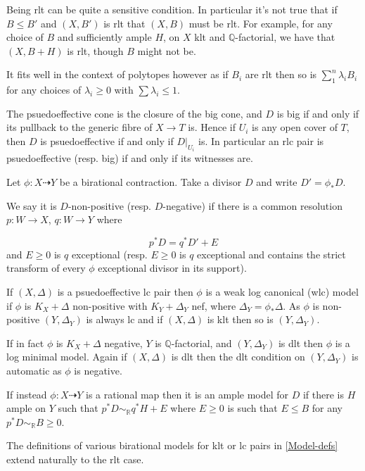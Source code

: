 	Being rlt can be quite a sensitive condition. In particular it's not true that if $B \leq B'$ and $(X,B')$ is rlt that $(X,B)$ must be rlt. For example, for any choice of $B$ and sufficiently ample $H$, on $X$ klt and $\mathbb{Q}$-factorial, we have that $(X,B+H)$ is rlt, though $B$ might not be.
	
	It fits well in the context of polytopes however as if $B_{i}$ are rlt then so is $\sum_{1}^{n} \lambda_{i}B_{i}$ for any choices of $\lambda_{i} \geq 0$ with $\sum \lambda_{i} \leq 1$.
	
	The psuedoeffective cone is the closure of the big cone, and $D$ is big if and only if its pullback to the generic fibre of $X \to T$ is. Hence if $U_{i}$ is any open cover of $T$, then $D$ is psuedoeffective if and only if $D|_{U_{i}}$ is. In particular an rlc pair is psuedoeffective (resp. big) if and only if its witnesses are.
	
	\begin{definition}
		Let $\phi:X \dashrightarrow Y$ be a birational contraction. Take a divisor $D$ and write $D'=\phi_{*}D$. 
		
		We say it is $D$-non-positive (resp. $D$-negative) if there is a common resolution $p:W \to X$, $q:W \to Y$ where 
		
		\[p^{*}D=q^{*}D'+E\]
		and $E \geq 0$ is $q$ exceptional (resp. $E \geq 0$ is $q$ exceptional and contains the strict transform of every $\phi$ exceptional divisor in its support). 
		
		If $(X,\Delta)$ is a psuedoeffective lc pair then $\phi$ is a weak log canonical (wlc) model if $\phi$ is $K_{X}+\Delta$ non-positive with $K_{Y}+\Delta_{Y}$ nef, where $\Delta_{Y}=\phi_{*}\Delta$. As $\phi$ is non-positive $(Y,\Delta_{Y})$ is always lc and if $(X,\Delta)$ is klt then so is $(Y,\Delta_{Y})$. 
		
		If in fact $\phi$ is $K_{X}+\Delta$ negative, $Y$ is $\mathbb{Q}$-factorial, and $(Y,\Delta_{Y})$ is dlt then $\phi$ is a log minimal model. Again if $(X,\Delta)$ is dlt then the dlt condition on $(Y,\Delta_{Y})$ is automatic as $\phi$ is negative.
		
		If instead $\phi:X \dashrightarrow Y$ is a rational map then it is an ample model for $D$ if there is $H$ ample on $Y$ such that $p^{*}D\sim_{\mathbb{R}}q^{*}H+E$ where $E \geq 0$ is such that $E \leq B$ for any $p^{*}D \sim_{\mathbb{R}} B \geq 0$.
	\end{definition}


	The definitions of various birational models for klt or lc pairs in \autoref{Model-defs} extend naturally to the rlt case.

